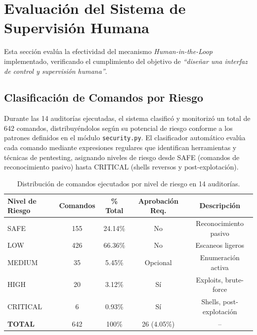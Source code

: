
\section{Evaluación del Sistema de Supervisión Humana}
\label{sec:evaluacion_hitl}

Esta sección evalúa la efectividad del mecanismo \textit{Human-in-the-Loop} implementado, verificando el cumplimiento del objetivo de \textit{``diseñar una interfaz de control y supervisión humana''}.

\subsection{Clasificación de Comandos por Riesgo}

Durante las 14 auditorías ejecutadas, el sistema clasificó y monitorizó un total de 642 comandos, distribuyéndolos según su potencial de riesgo conforme a los patrones definidos en el módulo \texttt{security.py}. El clasificador automático evalúa cada comando mediante expresiones regulares que identifican herramientas y técnicas de pentesting, asignando niveles de riesgo desde SAFE (comandos de reconocimiento pasivo) hasta CRITICAL (shells reversos y post-explotación).

\begin{table}[H]
\centering
\renewcommand{\arraystretch}{1.2}
\begin{tabular}{|l|c|c|c|c|}
\hline
\rowcolor[gray]{0.85}
\textbf{Nivel de Riesgo} & \textbf{Comandos} & \textbf{\% Total} & \textbf{Aprobación Req.} & \textbf{Descripción} \\
\hline
SAFE & 155 & 24.14\% & No & Reconocimiento pasivo \\
\hline
LOW & 426 & 66.36\% & No & Escaneos ligeros \\
\hline
MEDIUM & 35 & 5.45\% & Opcional & Enumeración activa \\
\hline
HIGH & 20 & 3.12\% & Sí & Exploits, brute-force \\
\hline
CRITICAL & 6 & 0.93\% & Sí & Shells, post-explotación \\
\hline
\rowcolor[gray]{0.95}
\textbf{TOTAL} & 642 & 100\% & 26 (4.05\%) & -- \\
\hline
\end{tabular}
\caption{Distribución de comandos ejecutados por nivel de riesgo en 14 auditorías.}
\label{tab:distribucion_riesgo}
\end{table}

